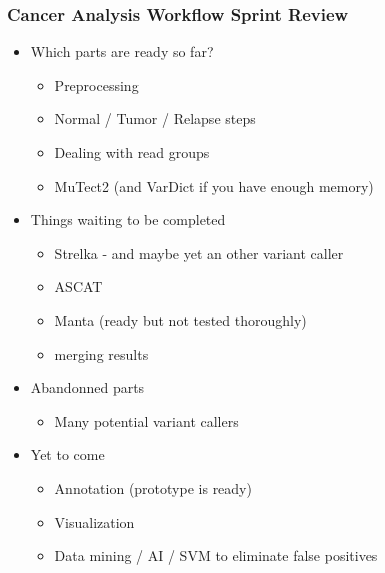 \documentclass{beamer}
\begin{document}
\begin{frame}
\frametitle{Cancer Analysis Workflow Sprint Review}
\begin{itemize}
	\item Which parts are ready so far?
		\begin{itemize}
			\item Preprocessing
			\item Normal / Tumor / Relapse steps
			\item Dealing with read groups
			\item MuTect2 (and VarDict if you have enough memory)
		\end{itemize}
	\item Things waiting to be completed
		\begin{itemize}
			\item Strelka - and maybe yet an other variant caller
			\item ASCAT
			\item Manta (ready but not tested thoroughly)
			\item merging results
		\end{itemize}
	\item Abandonned parts
		\begin{itemize}
			\item Many potential variant callers
		\end{itemize}
	\item Yet to come
		\begin{itemize}
			\item Annotation (prototype is ready)
			\item Visualization
			\item Data mining / AI / SVM to eliminate false positives
		\end{itemize}
\end{itemize}
\end{frame}
\end{document}
